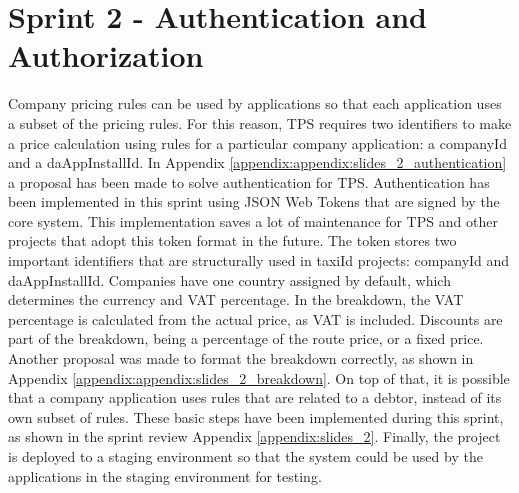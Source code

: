 \section{Sprint 2 - Authentication and Authorization}
Company pricing rules can be used by applications so that each application uses a subset of the pricing rules. For this reason, TPS requires two identifiers to make a price calculation using rules for a particular company application: a companyId and a daAppInstallId. In Appendix \ref{appendix:appendix:slides_2_authentication} a proposal has been made to solve authentication for TPS. Authentication has been implemented in this sprint using JSON Web Tokens that are signed by the core system. This implementation saves a lot of maintenance for TPS and other projects that adopt this token format in the future. The token stores two important identifiers that are structurally used in taxiId projects: companyId and daAppInstallId. Companies have one country assigned by default, which determines the currency and VAT percentage. In the breakdown, the VAT percentage is calculated from the actual price, as VAT is included. Discounts are part of the breakdown, being a percentage of the route price, or a fixed price. Another proposal was made to format the breakdown correctly, as shown in Appendix \ref{appendix:appendix:slides_2_breakdown}. On top of that, it is possible that a company application uses rules that are related to a debtor, instead of its own subset of rules. These basic steps have been implemented during this sprint, as shown in the sprint review Appendix \ref{appendix:slides_2}. Finally, the project is deployed to a staging environment so that the system could be used by the applications in the staging environment for testing.

%
